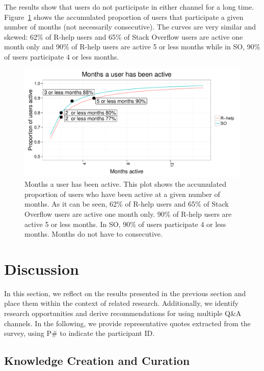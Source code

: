 \documentclass[smallextended]{svjour3}       %
\newcommand{\SO}{Stack Overflow\xspace}
\newcommand{\RH}{R-help\xspace}
\begin{document}
The results show that users do not participate in either channel for a long
time. Figure~\ref{fig:monthsPerUser} shows the accumulated proportion of users that participate a given number of
months (not necessarily consecutive). The curves are very similar and skewed: 62\% of \RH users and 65\% of \SO users are active one month only and
90\% of \RH users are active 5 or less months while in SO, 90\% of users participate 4 or less months.

\begin{figure}[htbp]
  \centering
  \includegraphics[width=.95\textwidth]{figs/monthsPerUser.pdf}
  \caption{Months a user has been active. This plot shows the accumulated proportion of users who have been active at a
    given number of months. As it can be seen, 62\% of \RH users and 65\% of \SO users are active one month only.
    90\% of \RH users are active 5 or less months. In SO, 90\% of users participate 4 or less months. Months do not have
  to consecutive.}
  \label{fig:monthsPerUser}
\end{figure}



\section{Discussion}
\label{cha:theory}

In this section, we reflect on the results presented in the previous section and place them within the context of related research. Additionally, we identify research opportunities and derive recommendations for using multiple Q\&A channels.
In the following, we provide representative quotes extracted from the survey, using P\# to indicate the participant ID.

\subsection{Knowledge Creation and Curation}
\end{document}
